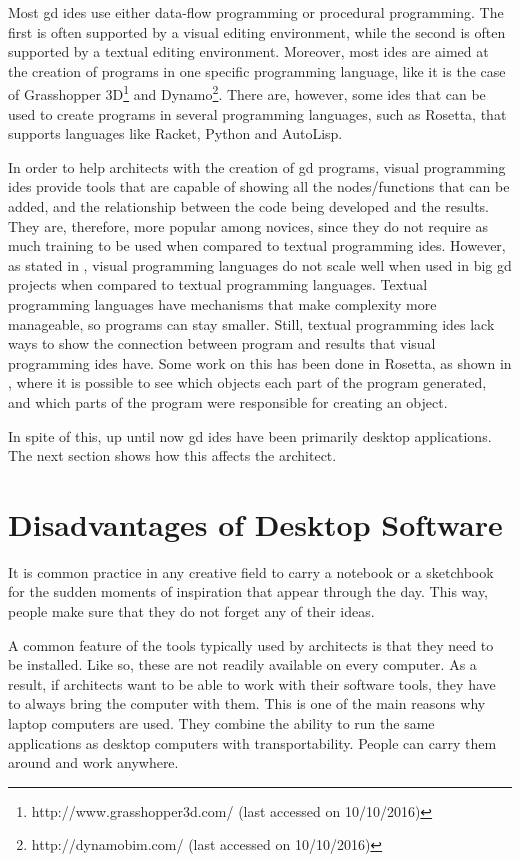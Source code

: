 Most \gls{gd} \glspl{ide} use either data-flow programming or procedural programming.
The first is often supported by a visual editing environment, while the second is often supported by a textual editing environment.
Moreover, most \glspl{ide} are aimed at the creation of programs in one specific programming language, like it is the case of Grasshopper 3D\footnote{http://www.grasshopper3d.com/ (last accessed on 10/10/2016)} and Dynamo\footnote{http://dynamobim.com/ (last accessed on 10/10/2016)}.
There are, however, some \glspl{ide} that can be used to create programs in several programming languages, such as Rosetta\cite{de2012modern}, that supports languages like Racket, Python and AutoLisp.

In order to help architects with the creation of \gls{gd} programs, visual programming \glspl{ide} provide tools that are capable of showing all the nodes/functions that can be added, and the relationship between the code being developed and the results.
They are, therefore, more popular among novices, since they do not require as much training to be used when compared to textual programming \glspl{ide}.
However, as stated in \cite{leitao2012programming}, visual programming languages do not scale well when used in big \gls{gd} projects when compared to textual programming languages.
Textual programming languages have mechanisms that make complexity more manageable, so programs can stay smaller.
Still, textual programming \glspl{ide} lack ways to show the connection between program and results that visual programming \glspl{ide} have.
Some work on this has been done in Rosetta, as shown in \cite{de2012modern}, where it is possible to see which objects each part of the program generated, and which parts of the program were responsible for creating an object.

In spite of this, up until now \gls{gd} \glspl{ide} have been primarily desktop applications.
The next section shows how this affects the architect.


\section{Disadvantages of Desktop Software}
It is common practice in any creative field to carry a notebook or a sketchbook for the sudden moments of inspiration that appear through the day.
This way, people make sure that they do not forget any of their ideas.

A common feature of the tools typically used by architects is that they need to be installed.
Like so, these are not readily available on every computer.
As a result, if architects want to be able to work with their software tools, they have to always bring the computer with them.
This is one of the main reasons why laptop computers are used.
They combine the ability to run the same applications as desktop computers with transportability.
People can carry them around and work anywhere.

